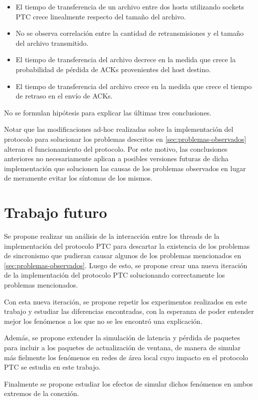 \documentclass[a4paper, 10pt, twoside]{article}
\begin{document}
\begin{itemize}
  \item El tiempo de transferencia de un archivo entre dos hosts utilizando sockets PTC crece linealmente respecto del tamaño del archivo.

  \item No se observa correlación entre la cantidad de retransmisiones y el tamaño del archivo transmitido.

  \item El tiempo de transferencia del archivo decrece en la medida que crece la probabilidad de pérdida de ACKs provenientes del host destino.

  \item El tiempo de transferencia del archivo crece en la medida que crece el tiempo de retraso en el envío de ACKs.
\end{itemize}

No se formulan hipótesis para explicar las últimas tres conclusiones.

Notar que las modificaciones ad-hoc realizadas sobre la implementación del protocolo para solucionar los problemas descritos en \ref{sec:problemas-observados} alteran el funcionamiento del protocolo. Por este motivo, las conclusiones anteriores no necesariamente aplican a posibles versiones futuras de dicha implementación que solucionen las causas de los problemas observados en lugar de meramente evitar los síntomas de los mismos.




\section{Trabajo futuro}

Se propone realizar un análisis de la interacción entre los threads de la implementación del protocolo PTC para descartar la existencia de los problemas de sincronismo que pudieran causar algunos de los problemas mencionados en \ref{sec:problemas-observados}. Luego de esto, se propone crear una nueva iteración de la implementación del protocolo PTC solucionando correctamente los problemas mencionados.

Con esta nueva iteración, se propone repetir los experimentos realizados en este trabajo y estudiar las diferencias encontradas, con la esperanza de poder entender mejor los fenómenos a los que no se les encontró una explicación.

Además, se propone extender la simulación de latencia y pérdida de paquetes para incluir a los paquetes de actualización de ventana, de manera de simular más fielmente los fenómenos en redes de área local cuyo impacto en el protocolo PTC se estudia en este trabajo.

Finalmente se propone estudiar los efectos de simular dichos fenómenos en ambos extremos de la conexión.
\end{document}
